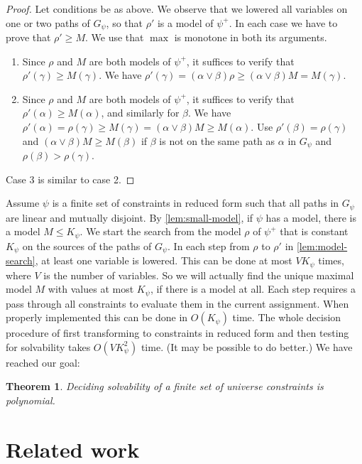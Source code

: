 \documentclass[11pt,a4paper]{article}
\newtheorem{theorem}{Theorem}[section]
\begin{document}
\begin{proof}
Let conditions be as above. We observe that we lowered all variables on one or two
paths of $G_ \psi$, so that $\rho'$ is a model of $ \psi^+$. In each case we
have to prove that $\rho'\geq M$.
We use that $\max$ is monotone in both its arguments.
\begin{enumerate}
\item Since $\rho$ and $M$ are both models of $ \psi^+$, it suffices to 
verify that $\rho'(\gamma)\geq M(\gamma)$. We have 
$\rho'(\gamma)= (\alpha\vee\beta)\rho \geq (\alpha\vee\beta)M = M(\gamma)$.
\item Since $\rho$ and $M$ are both models of $ \psi^+$, it suffices to 
verify that $\rho'(\alpha)\geq M(\alpha)$, and similarly for $\beta$. We have
$\rho'(\alpha)= \rho(\gamma)\geq M(\gamma) = (\alpha\vee\beta)M \geq M(\alpha)$.
Use $\rho'(\beta) = \rho(\gamma)$ and $(\alpha\vee\beta)M \geq M(\beta)$
if $\beta$ is not on the same path as $\alpha$ in $G_ \psi$ and $\rho(\beta)>\rho(\gamma)$. 
\end{enumerate}
Case 3 is similar to case 2.
\end{proof}

Assume  $\psi$ is a finite set of constraints in reduced form such that all paths 
in $G_ \psi$ are linear and mutually disjoint. By \cref{lem:small-model},
if  $\psi$ has a model, there is a model $M \leq K_ \psi$.
We start the search from the model $\rho$ of $ \psi^+$ that is constant $K_ \psi$
on the sources of the paths of $G_ \psi$.
In each step from $\rho$ to $\rho'$ in \cref{lem:model-search},
at least one variable is lowered. This can be done at most $V K_ \psi$ times,
where $V$ is the number of variables. So we will actually find the unique maximal
model $M$ with values at most $K_ \psi$, if there is a model at all.
Each step requires a pass through all constraints to evaluate them in the current assignment.
When properly implemented this can be done in $O(K_ \psi)$ time.
The whole decision procedure of first transforming to constraints in reduced
form and then testing for solvability takes $O(V K^2_ \psi)$ time.
(It may be possible to do better.) We have reached our goal:

\begin{theorem}\label{thm:P-solvability}
Deciding solvability of a finite set of universe constraints is polynomial.
\end{theorem}


\section{Related work}
\end{document}
